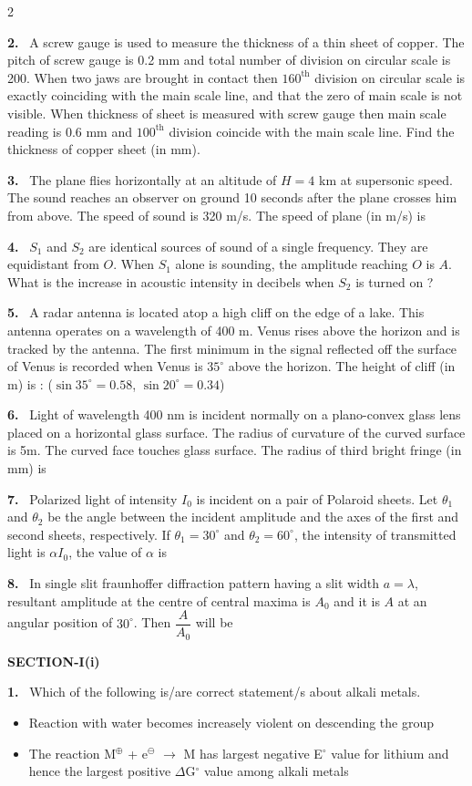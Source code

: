 \documentclass[10pt]{extarticle}
\newcommand{\partsec}[2]{\par\medskip\noindent{\large\bfseries PART-#1: #2}\par\smallskip}
\newcommand{\sect}[1]{\par\smallskip\noindent\textbf{#1}\par}
\newcommand{\qn}[1]{\par\smallskip\noindent\textbf{#1.}~}
\newenvironment{qoptions}{\begin{itemize}[leftmargin=1.8em,itemsep=1pt,topsep=2pt,label={}]}{\end{itemize}}
\newcommand{\opt}[2]{\item[(#1)] #2}
\begin{document}
\begin{multicols}{2}
\qn{2} A screw gauge is used to measure the thickness of a thin sheet of copper. The pitch of screw gauge is 0.2 mm and total number of division on circular scale is 200. When two jaws are brought in contact then $160^{\mathrm{th}}$ division on circular scale is exactly coinciding with the main scale line, and that the zero of main scale is not visible. When thickness of sheet is measured with screw gauge then main scale reading is 0.6 mm and $100^{\mathrm{th}}$ division coincide with the main scale line. Find the thickness of copper sheet (in mm).
\qn{3} The plane flies horizontally at an altitude of $H=4$ km at supersonic speed. The sound reaches an observer on ground 10 seconds after the plane crosses him from above. The speed of sound is 320 m/s. The speed of plane (in m/s) is
\qn{4} $S_1$ and $S_2$ are identical sources of sound of a single frequency. They are equidistant from $O$. When $S_1$ alone is sounding, the amplitude reaching $O$ is $A$. What is the increase in acoustic intensity in decibels when $S_2$ is turned on ?
\qn{5} A radar antenna is located atop a high cliff on the edge of a lake. This antenna operates on a wavelength of 400 m. Venus rises above the horizon and is tracked by the antenna. The first minimum in the signal reflected off the surface of Venus is recorded when Venus is $35^\circ$ above the horizon. The height of cliff (in m) is : ($\sin35^\circ=0.58$, $\sin20^\circ=0.34$)
\qn{6} Light of wavelength 400 nm is incident normally on a plano-convex glass lens placed on a horizontal glass surface. The radius of curvature of the curved surface is 5m. The curved face touches glass surface. The radius of third bright fringe (in mm) is
\qn{7} Polarized light of intensity $I_0$ is incident on a pair of Polaroid sheets. Let $\theta_1$ and $\theta_2$ be the angle between the incident amplitude and the axes of the first and second sheets, respectively. If $\theta_1=30^\circ$ and $\theta_2=60^\circ$, the intensity of transmitted light is $\alpha I_0$, the value of $\alpha$ is
\qn{8} In single slit fraunhoffer diffraction pattern having a slit width $a=\lambda$, resultant amplitude at the centre of central maxima is $A_0$ and it is $A$ at an angular position of $30^\circ$. Then $\dfrac{A}{A_0}$ will be
\partsec{2}{CHEMISTRY}
\sect{SECTION-I(i)}
\qn{1} Which of the following is/are correct statement/s about alkali metals.
\begin{qoptions}
\opt{A}{Reaction with water becomes increasely violent on descending the group}
\opt{B}{The reaction M$^{\oplus}$ + e$^{\ominus}$ $\to$ M has largest negative E$^\circ$ value for lithium and hence the largest positive $\Delta$G$^\circ$ value among alkali metals}

\end{qoptions}
\end{multicols}
\end{document}
